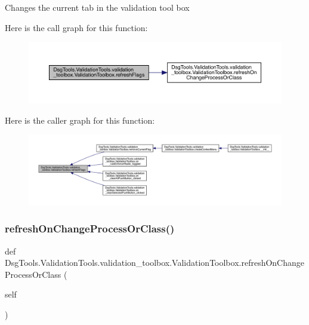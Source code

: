 \begin{DoxyVerb}Changes the current tab in the validation tool box
\end{DoxyVerb}
 Here is the call graph for this function\+:
\nopagebreak
\begin{figure}[H]
\begin{center}
\leavevmode
\includegraphics[width=350pt]{class_dsg_tools_1_1_validation_tools_1_1validation__toolbox_1_1_validation_toolbox_a6d976bd8898c775b1f3a68a2299fcb2a_cgraph}
\end{center}
\end{figure}
Here is the caller graph for this function\+:
\nopagebreak
\begin{figure}[H]
\begin{center}
\leavevmode
\includegraphics[width=350pt]{class_dsg_tools_1_1_validation_tools_1_1validation__toolbox_1_1_validation_toolbox_a6d976bd8898c775b1f3a68a2299fcb2a_icgraph}
\end{center}
\end{figure}
\mbox{\label{class_dsg_tools_1_1_validation_tools_1_1validation__toolbox_1_1_validation_toolbox_ae1a925049c04e40014efcac2cbb4ec8c}} 
\subsubsection{\texorpdfstring{refresh\+On\+Change\+Process\+Or\+Class()}{refreshOnChangeProcessOrClass()}}
{\footnotesize\ttfamily def Dsg\+Tools.\+Validation\+Tools.\+validation\+\_\+toolbox.\+Validation\+Toolbox.\+refresh\+On\+Change\+Process\+Or\+Class (\begin{DoxyParamCaption}\item[{}]{self }\end{DoxyParamCaption})}

